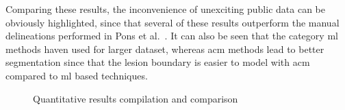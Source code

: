 Comparing these results, the inconvenience of unexciting public data can be obviously highlighted, since that several of these results outperform the manual delineations performed in Pons et al.~\cite{gerard2013}.
It can also be seen that the category \ac{ml} methods haven used for larger dataset, whereas \ac{acm} methods lead to better segmentation since that the lesion boundary is easier to model with \ac{acm} compared to \ac{ml} based techniques.

\begin{figure}[t]
  \begin{subfigure}[b]{\textwidth}
    {\tiny }
    \label{fig:surveyResults:survey}
  \end{subfigure}
  \begin{subfigure}[b]{\textwidth}
    {\tiny  }
    \label{fig:surveyResults:comparison}
  \end{subfigure}
  \caption{Quantitative results compilation and comparison}
  \label{fig:surveyResults}
\end{figure}


